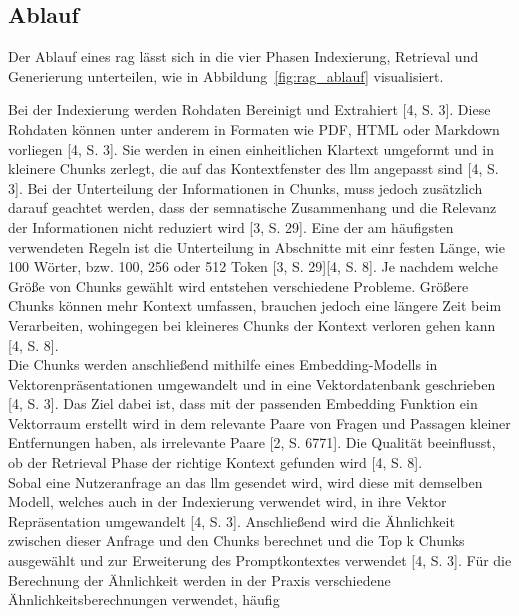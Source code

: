 \subsection{Ablauf}

Der Ablauf eines \ac{rag} lässt sich in die vier Phasen Indexierung, Retrieval und Generierung unterteilen, wie in Abbildung~\ref{fig:rag_ablauf} visualisiert.


Bei der Indexierung werden Rohdaten Bereinigt und Extrahiert [4, S. 3]. Diese Rohdaten können unter anderem in Formaten wie PDF, HTML oder Markdown vorliegen [4, S. 3].
Sie werden in einen einheitlichen Klartext umgeformt und in kleinere Chunks zerlegt, die auf das Kontextfenster des \ac{llm} angepasst sind [4, S. 3]. Bei der 
Unterteilung der Informationen in Chunks, muss jedoch zusätzlich darauf geachtet werden, dass der semnatische Zusammenhang und die Relevanz der Informationen nicht
reduziert wird [3, S. 29]. Eine der am häufigsten verwendeten Regeln ist die Unterteilung in Abschnitte mit einr festen Länge, wie 100 Wörter, bzw. 100, 256 oder
512 Token [3, S. 29][4, S. 8]. Je nachdem welche Größe von Chunks gewählt wird entstehen verschiedene Probleme. Größere Chunks können mehr Kontext umfassen, brauchen
jedoch eine längere Zeit beim Verarbeiten, wohingegen bei kleineres Chunks der Kontext verloren gehen kann [4, S. 8]. \\
Die Chunks werden anschließend mithilfe eines Embedding-Modells in Vektorenpräsentationen umgewandelt und in eine Vektordatenbank geschrieben [4, S. 3]. Das Ziel 
dabei ist, dass mit der passenden Embedding Funktion ein Vektorraum erstellt wird in dem relevante Paare von Fragen und Passagen kleiner Entfernungen haben, als 
irrelevante Paare [2, S. 6771]. Die Qualität beeinflusst, ob der Retrieval Phase der richtige Kontext gefunden wird [4, S. 8]. \\
Sobal eine Nutzeranfrage an das \ac{llm} gesendet wird, wird diese mit demselben Modell, welches auch in der Indexierung verwendet wird, in ihre Vektor
Repräsentation umgewandelt [4, S. 3]. Anschließend wird die Ähnlichkeit zwischen dieser Anfrage und den Chunks berechnet und die Top k Chunks ausgewählt und zur
Erweiterung des Promptkontextes verwendet [4, S. 3]. Für die Berechnung der Ähnlichkeit werden in der Praxis verschiedene Ähnlichkeitsberechnungen verwendet, häufig 
